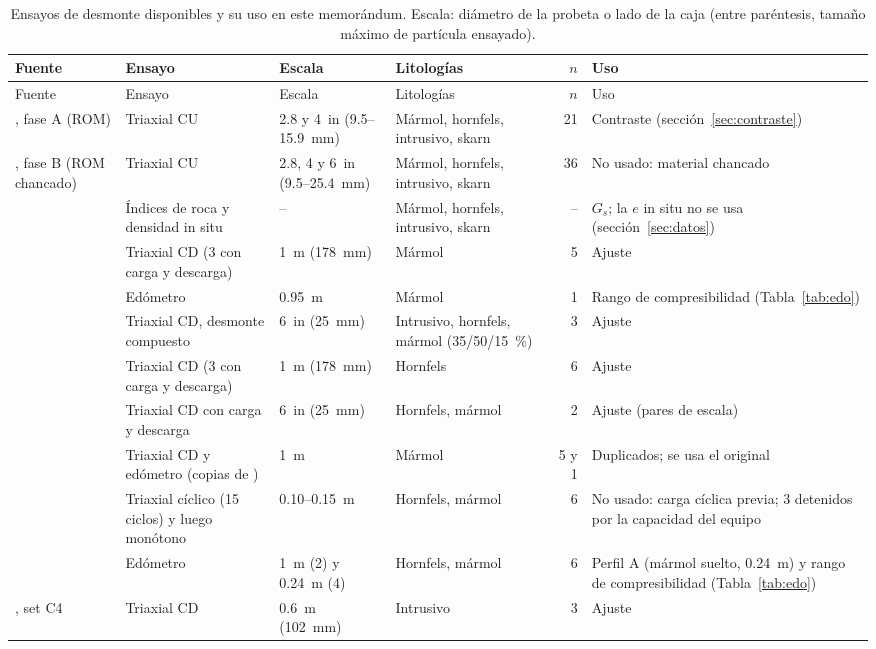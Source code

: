 \documentclass[11pt,letterpaper]{article}
\begin{document}
\begin{footnotesize}\setlength{\tabcolsep}{3pt}
\begin{longtable}{L{3.0cm}L{3.0cm}L{2.2cm}L{2.6cm}rL{3.0cm}}
\caption{Ensayos de desmonte disponibles y su uso en este memorándum. Escala: diámetro de la probeta o lado de la caja (entre paréntesis, tamaño máximo de partícula ensayado).}\label{tab:inventario}\\
\toprule Fuente & Ensayo & Escala & Litologías & $n$ & Uso\\\midrule\endfirsthead
\toprule Fuente & Ensayo & Escala & Litologías & $n$ & Uso\\\midrule\endhead
\citet{g2010}, fase A (ROM) & Triaxial CU & 2.8 y 4~in (9.5--15.9~mm) & Mármol, hornfels, intrusivo, skarn & 21 & Contraste (sección~\ref{sec:contraste}) \\
\citet{g2010}, fase B (ROM chancado) & Triaxial CU & 2.8, 4 y 6~in (9.5--25.4~mm) & Mármol, hornfels, intrusivo, skarn & 36 & No usado: material chancado \\
\citet{g2010} & Índices de roca y densidad in situ & -- & Mármol, hornfels, intrusivo, skarn & -- & $G_s$; la $e$ in situ no se usa (sección~\ref{sec:datos}) \\
\citet{g2012} & Triaxial CD (3 con carga y descarga) & 1~m (178~mm) & Mármol & 5 & Ajuste \\
\citet{g2012} & Edómetro & 0.95~m & Mármol & 1 & Rango de compresibilidad (Tabla~\ref{tab:edo}) \\
\citet{g2021} & Triaxial CD, desmonte compuesto & 6~in (25~mm) & Intrusivo, hornfels, mármol (35/50/15~\%) & 3 & Ajuste \\
\citet{w2022} & Triaxial CD (3 con carga y descarga) & 1~m (178~mm) & Hornfels & 6 & Ajuste \\
\citet{w2022} & Triaxial CD con carga y descarga & 6~in (25~mm) & Hornfels, mármol & 2 & Ajuste (pares de escala) \\
\citet{w2022} & Triaxial CD y edómetro (copias de \citealp{g2012}) & 1~m & Mármol & 5 y 1 & Duplicados; se usa el original \\
\citet{w2022} & Triaxial cíclico (15 ciclos) y luego monótono & 0.10--0.15~m & Hornfels, mármol & 6 & No usado: carga cíclica previa; 3 detenidos por la capacidad del equipo \\
\citet{w2022} & Edómetro & 1~m (2) y 0.24~m (4) & Hornfels, mármol & 6 & Perfil A (mármol suelto, 0.24~m) y rango de compresibilidad (Tabla~\ref{tab:edo}) \\
\citet{w2024}, set C4 & Triaxial CD & 0.6~m (102~mm) & Intrusivo & 3 & Ajuste \\

\end{longtable}
\end{footnotesize}
\end{document}
